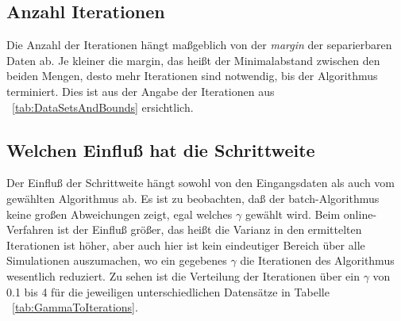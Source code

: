 \documentclass[]{report}
\begin{document}
\subsection{Anzahl Iterationen}

Die Anzahl der Iterationen h\"angt ma{\ss}geblich von der \emph{margin} der separierbaren Daten ab. Je kleiner die margin, das hei{\ss}t der Minimalabstand zwischen den beiden Mengen, desto mehr Iterationen sind notwendig, bis der Algorithmus terminiert. Dies ist aus der Angabe der Iterationen aus ~\ref{tab:DataSetsAndBounds} ersichtlich.


\subsection{Welchen Einflu{\ss} hat die Schrittweite}

Der Einflu{\ss} der Schrittweite h\"angt sowohl von den Eingangsdaten als auch vom gew\"ahlten Algorithmus ab.
Es ist zu beobachten, da{\ss} der batch-Algorithmus keine gro{\ss}en Abweichungen zeigt, egal welches $\gamma$ gew\"ahlt wird. Beim online-Verfahren ist der Einflu{\ss} gr\"o{\ss}er, das hei{\ss}t die Varianz in den ermittelten Iterationen ist h\"oher, aber auch hier ist kein eindeutiger Bereich \"uber alle Simulationen auszumachen, wo ein gegebenes $\gamma$ die Iterationen des Algorithmus wesentlich reduziert. Zu sehen ist die Verteilung der Iterationen \"uber ein $\gamma$ von 0.1 bis 4 f\"ur die jeweiligen unterschiedlichen Datens\"atze in Tabelle ~\ref{tab:GammaToIterations}.
\end{document}
